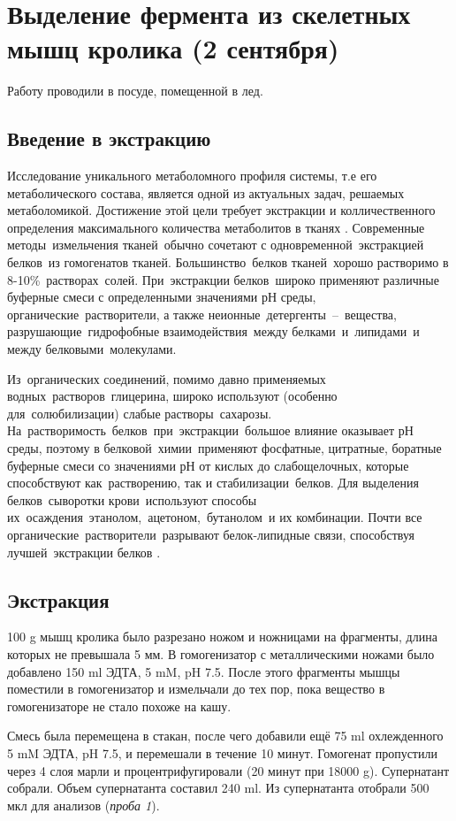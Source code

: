 \section{Выделение фермента из скелетных мышц кролика (2 сентября)}
Работу проводили в посуде, помещенной в лед.

\subsection{Введение в экстракцию}
Исследование уникального метаболомного профиля системы, т.е его метаболического состава, является одной из
актуальных задач, решаемых метаболомикой.
Достижение этой цели требует экстракции и колличественного определения максимального количества
метаболитов в тканях \cite{kursovaya-garika}.
Современные методы измельчения тканей обычно сочетают с одновременной экстракцией белков из гомогенатов
тканей.
Большинство белков тканей хорошо растворимо в 8-10\% растворах солей.
При экстракции белков широко применяют различные буферные смеси с определенными значениями рН среды,
органические растворители, а также неионные детергенты -- вещества, разрушающие гидрофобные
взаимодействия между белками и липидами и между белковыми молекулами.

Из органических соединений, помимо давно применяемых водных растворов глицерина, широко используют
(особенно для солюбилизации) слабые растворы сахарозы.
На растворимость белков при экстракции большое влияние оказывает рН среды, поэтому в
белковой химии применяют фосфатные, цитратные, боратные буферные смеси со значениями рН от кислых до
слабощелочных, которые способствуют как растворению, так и стабилизации белков.
Для выделения белков сыворотки крови используют способы их осаждения этанолом, ацетоном, бутанолом и их
комбинации.
Почти все органические растворители разрывают белок-липидные связи, способствуя лучшей экстракции
белков \cite{berezov}.

\subsection{Экстракция}
100 g мышц кролика было разрезано ножом и ножницами на фрагменты,
длина которых не превышала 5 мм.
В гомогенизатор с металлическими ножами было добавлено 150 ml ЭДТА, 5 mM, pH 7.5.
После этого фрагменты мышцы поместили в гомогенизатор и измельчали до тех пор,
пока вещество в гомогенизаторе не стало похоже на кашу.

Смесь была перемещена в стакан, после чего добавили ещё 75 ml охлежденного 5 mM ЭДТА, pH 7.5,
и перемешали в течение 10 минут.
Гомогенат пропустили через 4 слоя марли и процентрифугировали (20 минут при 18000 g).
Супернатант собрали. Объем супернатанта составил 240 ml.
Из супернатанта отобрали 500 мкл для анализов (\emph{проба 1}).

